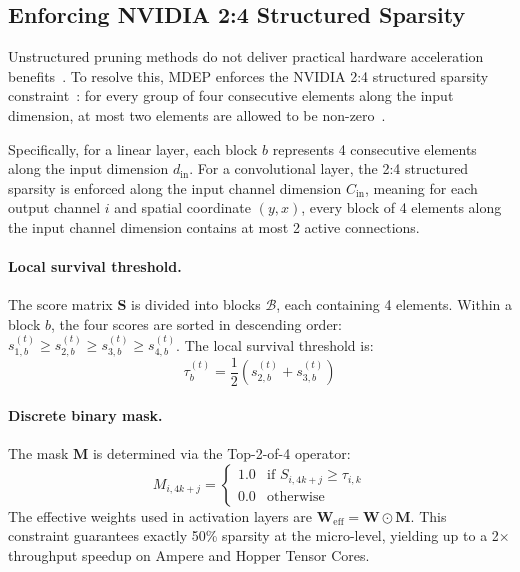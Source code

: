 \documentclass[letterpaper]{article} %
\begin{document}
\subsection{Enforcing NVIDIA 2:4 Structured Sparsity}\label{subsec:nvidia24}

Unstructured pruning methods do not deliver practical hardware acceleration benefits~\cite{hoefler2021sparsity}. To resolve this, MDEP enforces the NVIDIA 2:4 structured sparsity constraint~\cite{mishra2021accelerating, nvidia2020a100}: for every group of four consecutive elements along the input dimension, at most two elements are allowed to be non-zero~\cite{zhou2021learning, hubara2021accelerated}. 

Specifically, for a linear layer, each block $b$ represents 4 consecutive elements along the input dimension $d_{\text{in}}$. For a convolutional layer, the 2:4 structured sparsity is enforced along the input channel dimension $C_{\text{in}}$, meaning for each output channel $i$ and spatial coordinate $(y, x)$, every block of 4 elements along the input channel dimension contains at most 2 active connections.

\paragraph{Local survival threshold.}
The score matrix $\bm{S}$ is divided into blocks $\mathcal{B}$, each containing 4 elements. Within a block $b$, the four scores are sorted in descending order: $s_{1,b}^{(t)} \ge s_{2,b}^{(t)} \ge s_{3,b}^{(t)} \ge s_{4,b}^{(t)}$. The local survival threshold is:
\begin{equation}\label{eq:tau}
    \tau_b^{(t)} = \frac{1}{2} \left(s_{2,b}^{(t)} + s_{3,b}^{(t)}\right)
\end{equation}

\paragraph{Discrete binary mask.}
The mask $\bm{M}$ is determined via the Top-2-of-4 operator:
\begin{equation}\label{eq:mask}
    M_{i, 4k+j} = \begin{cases}
        1.0 & \text{if } S_{i, 4k+j} \ge \tau_{i,k} \\
        0.0 & \text{otherwise}
    \end{cases}
\end{equation}
The effective weights used in activation layers are $\bm{W}_{\text{eff}} = \bm{W} \odot \bm{M}$. This constraint guarantees exactly 50\% sparsity at the micro-level, yielding up to a 2$\times$ throughput speedup on Ampere and Hopper Tensor Cores.
\end{document}
